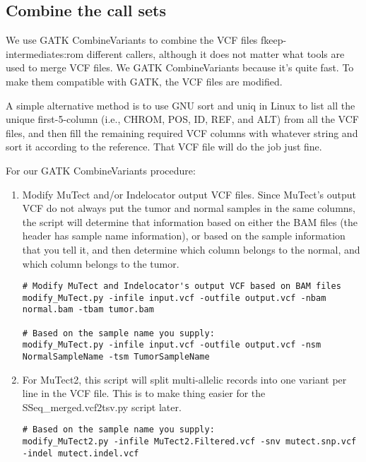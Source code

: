 \documentclass[10pt,letterpaper]{article}
\begin{document}
\begin{sloppypar}
\subsection{Combine the call sets}
	We use GATK CombineVariants to combine the VCF files fkeep-intermediates:rom different callers, although it does not matter what tools are used to merge VCF files. We GATK CombineVariants because it's quite fast. To make them compatible with GATK, the VCF files are modified.

	A simple alternative method is to use GNU sort and uniq in Linux to list all the unique first-5-column (i.e., CHROM, POS, ID, REF, and ALT) from all the VCF files, and then fill the remaining required VCF columns with whatever string and sort it according to the reference. That VCF file will do the job just fine. 

For our GATK CombineVariants procedure:

\begin{enumerate}

\item 
Modify MuTect and/or Indelocator output VCF files. 
Since MuTect's output VCF do not always put the tumor and normal samples in the same columns, the script will determine that information based on either the BAM files (the header has sample name information), or based on the sample information that you tell it, and then determine which column belongs to the normal, and which column belongs to the tumor. 
	
\begin{lstlisting}
# Modify MuTect and Indelocator's output VCF based on BAM files
modify_MuTect.py -infile input.vcf -outfile output.vcf -nbam normal.bam -tbam tumor.bam
	
# Based on the sample name you supply:
modify_MuTect.py -infile input.vcf -outfile output.vcf -nsm NormalSampleName -tsm TumorSampleName
\end{lstlisting}


\item
For MuTect2, this script will split multi-allelic records into one variant per line in the VCF file. This is to make thing easier for the SSeq\_merged.vcf2tsv.py script later. 

\begin{lstlisting}
# Based on the sample name you supply:
modify_MuTect2.py -infile MuTect2.Filtered.vcf -snv mutect.snp.vcf -indel mutect.indel.vcf
\end{lstlisting}



\end{enumerate}
\end{sloppypar}
\end{document}
